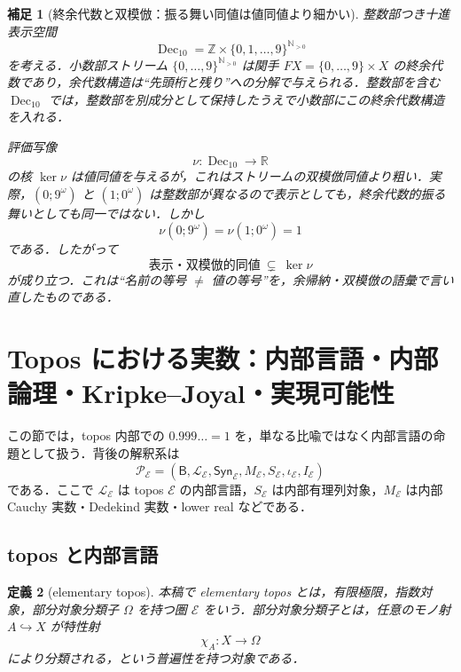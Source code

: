 \documentclass[a4paper,11pt]{ltjsarticle}
\theoremstyle{jpdef}
\newtheorem{definition}{定義}[section]
\newtheorem{remark}[definition]{補足}
\theoremstyle{jpthm}
\newcommand{\N}{\mathbb{N}}
\newcommand{\Z}{\mathbb{Z}}
\newcommand{\R}{\mathbb{R}}
\newcommand{\Lang}{\mathcal L}
\newcommand{\Dec}{\operatorname{Dec}_{10}}
\newcommand{\Ns}{\N_{>0}}
\begin{document}
\begin{remark}[終余代数と双模倣：振る舞い同値は値同値より細かい]
整数部つき十進表示空間
\[
  \Dec=\Z\times\{0,1,\ldots,9\}^{\Ns}
\]
を考える．小数部ストリーム \(\{0,\ldots,9\}^{\Ns}\) は関手 \(FX=\{0,
\ldots,9\}\times X\) の終余代数であり，余代数構造は``先頭桁と残り''への分解で与えられる．整数部を含む \(\Dec\) では，整数部を別成分として保持したうえで小数部にこの終余代数構造を入れる．

評価写像
\[
  \nu:\Dec\to\R
\]
の核 \(\ker\nu\) は値同値を与えるが，これはストリームの双模倣同値より粗い．実際，\((0;9^\omega)\) と \((1;0^\omega)\) は整数部が異なるので表示としても，終余代数的振る舞いとしても同一ではない．しかし
\[
  \nu(0;9^\omega)=\nu(1;0^\omega)=1
\]
である．したがって
\[
  \text{表示・双模倣的同値}\ \subsetneq\ \ker\nu
\]
が成り立つ．これは``名前の等号 \(\ne\) 値の等号''を，余帰納・双模倣の語彙で言い直したものである．
\end{remark}


\section{Topos における実数：内部言語・内部論理・Kripke--Joyal・実現可能性}

この節では，topos 内部での \(0.999\ldots=1\) を，単なる比喩ではなく内部言語の命題として扱う．背後の解釈系は
\[
  \mathcal P_{\mathcal E}
  =(\mathsf B,\Lang_{\mathcal E},\mathsf{Syn}_{\mathcal E},M_{\mathcal E},S_{\mathcal E},\iota_{\mathcal E},I_{\mathcal E})
\]
である．ここで \(\Lang_{\mathcal E}\) は topos \(\mathcal E\) の内部言語，\(S_{\mathcal E}\) は内部有理列対象，\(M_{\mathcal E}\) は内部 Cauchy 実数・Dedekind 実数・lower real などである．

\subsection{topos と内部言語}

\begin{definition}[elementary topos]
本稿で elementary topos とは，有限極限，指数対象，部分対象分類子 \(\Omega\) を持つ圏 \(\mathcal E\) をいう．部分対象分類子とは，任意のモノ射 \(A\hookrightarrow X\) が特性射
\[
  \chi_A:X\to\Omega
\]
により分類される，という普遍性を持つ対象である．
\end{definition}
\end{document}
